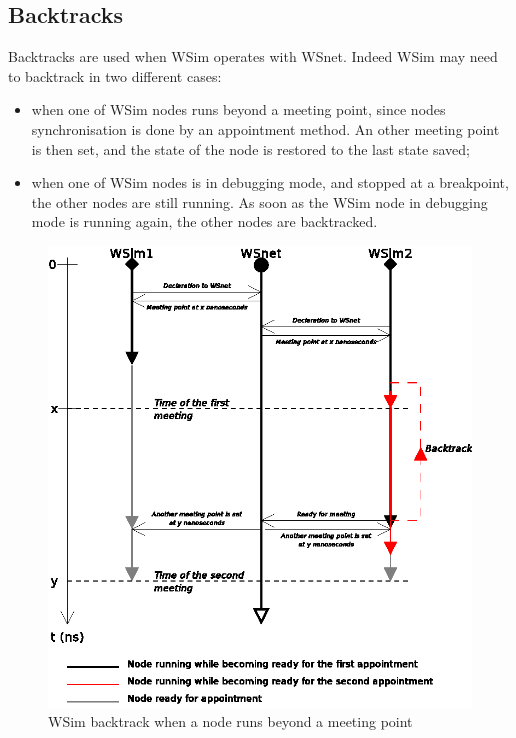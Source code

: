 \documentclass[a4paper,10pt]{report}
\begin{document}
\subsection{Backtracks}
Backtracks are used when WSim operates with WSnet. Indeed WSim may need to backtrack in two different cases:
\begin{itemize}
  \item when one of WSim nodes runs beyond a meeting point, since nodes synchronisation is done by an appointment method. An other meeting point is then set, and the state of the node is restored to the last state saved;
  \item when one of WSim nodes is in debugging mode, and stopped at a breakpoint, the other nodes are still running. As soon as the WSim node in debugging mode is running again, the other nodes are backtracked.
\end{itemize}

\begin{figure}
\begin{center}
  \includegraphics[scale=1]{figures/wsim_backtrack1.eps}
\end{center}
\caption{WSim backtrack when a node runs beyond a meeting point}
\label{wsim backtrack 1}
\end{figure}
\end{document}
